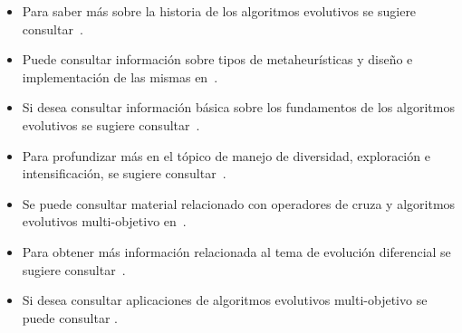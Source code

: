 \begin{itemize}
\item Para saber más sobre la historia de los algoritmos evolutivos se sugiere consultar~\cite{Fogel:98a,Segura:16}.
\item Puede consultar información sobre tipos de metaheurísticas y diseño e implementación de las mismas en~\cite{Talbi:09}.
\item Si desea consultar información básica sobre los fundamentos de los algoritmos evolutivos se sugiere consultar~\cite{eiben2003introduction,lobo2007parameter,back2000evolutionary}.
\item Para profundizar más en el tópico de manejo de diversidad, exploración e intensificación, se sugiere consultar~\cite{Crepinsek:13}.
\item Se puede consultar material relacionado con operadores de cruza y algoritmos evolutivos multi-objetivo en~\cite{coello2007evolutionary,Joel:Kalyanmoy,Joel:Coello}.
\item Para obtener más información relacionada al tema de evolución diferencial se sugiere consultar~\cite{price2006differential,chakraborty2008advances}.
\item Si desea consultar aplicaciones de algoritmos evolutivos multi-objetivo se puede consultar \cite{zitzler1999evolutionary,back1996evolutionary}.
\end{itemize}
